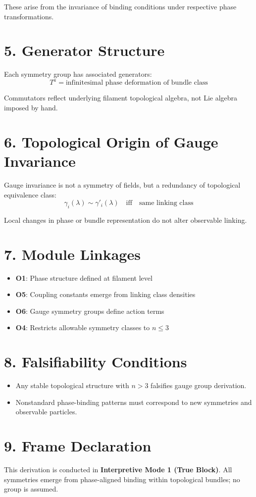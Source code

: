 \documentclass[12pt]{article}
\begin{document}
These arise from the invariance of binding conditions under respective phase transformations.

\section*{5. Generator Structure}

Each symmetry group has associated generators:
\[
T^a = \text{infinitesimal phase deformation of bundle class}
\]

Commutators reflect underlying filament topological algebra, not Lie algebra imposed by hand.

\section*{6. Topological Origin of Gauge Invariance}

Gauge invariance is not a symmetry of fields, but a redundancy of topological equivalence class:
\[
\gamma_i(\lambda) \sim \gamma'_i(\lambda) \quad \text{iff} \quad \text{same linking class}
\]

Local changes in phase or bundle representation do not alter observable linking.

\section*{7. Module Linkages}

\begin{itemize}
    \item \textbf{O1}: Phase structure defined at filament level
    \item \textbf{O5}: Coupling constants emerge from linking class densities
    \item \textbf{O6}: Gauge symmetry groups define action terms
    \item \textbf{O4}: Restricts allowable symmetry classes to \( n \leq 3 \)
\end{itemize}

\section*{8. Falsifiability Conditions}

\begin{itemize}
    \item Any stable topological structure with \( n > 3 \) falsifies gauge group derivation.
    \item Nonstandard phase-binding patterns must correspond to new symmetries and observable particles.
\end{itemize}

\section*{9. Frame Declaration}

This derivation is conducted in \textbf{Interpretive Mode 1 (True Block)}. All symmetries emerge from phase-aligned binding within topological bundles; no group is assumed.
\end{document}

